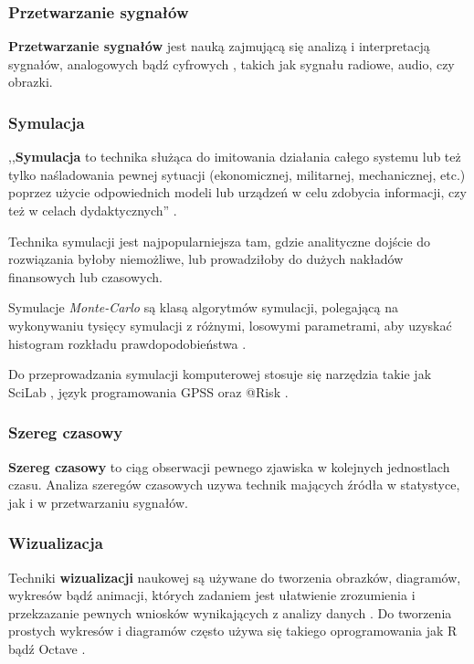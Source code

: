 \subsubsection{Przetwarzanie sygnałów}
\label{sub:przetwarzanie_sygnalow}
\textbf{Przetwarzanie sygnałów} jest nauką zajmującą się analizą i interpretacją sygnałów, analogowych bądź cyfrowych \cite{smith97}, takich jak sygnału radiowe, audio, czy obrazki.

\subsubsection{Symulacja}
\label{sub:symulacja}
,,\textbf{Symulacja} to technika służąca do imitowania działania całego systemu lub też tylko naśladowania pewnej sytuacji (ekonomicznej, militarnej, mechanicznej, etc.) poprzez użycie odpowiednich modeli lub urządzeń w celu zdobycia informacji, czy też w celach dydaktycznych'' \cite{www:symulacja}.

Technika symulacji jest najpopularniejsza tam, gdzie analityczne dojście do rozwiązania byłoby niemożliwe, lub prowadziłoby do dużych nakładów finansowych lub czasowych.

Symulacje \textit{Monte-Carlo} są klasą algorytmów symulacji, polegającą na wykonywaniu tysięcy symulacji z różnymi, losowymi parametrami, aby uzyskać histogram rozkładu prawdopodobieństwa \cite{math:monte-carlo}.

Do przeprowadzania symulacji komputerowej stosuje się narzędzia takie jak SciLab \cite{www:scilab}, język programowania GPSS \cite{www:gpss} oraz @Risk \cite{www:risk}.

\subsubsection{Szereg czasowy}
\label{sub:szereg_czasowy}
\textbf{Szereg czasowy} to ciąg obserwacji pewnego zjawiska w kolejnych jednostlach czasu. Analiza szeregów czasowych uzywa technik mających źródła w statystyce, jak i w przetwarzaniu sygnałów.

\subsubsection{Wizualizacja}
\label{sub:wizualizacja}
Techniki \textbf{wizualizacji} naukowej są używane do tworzenia obrazków, diagramów, wykresów bądź animacji, których zadaniem jest ułatwienie zrozumienia i przekzazanie pewnych wniosków wynikających z analizy danych \cite{lawrence1994}. Do tworzenia prostych wykresów i diagramów często używa się takiego oprogramowania jak R \cite{www:R} bądź Octave \cite{www:octave}.

